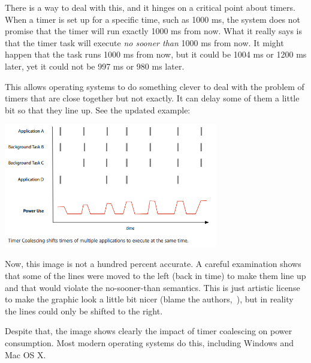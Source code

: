 There is a way to deal with this, and it hinges on a critical point about timers. When a timer is set up for a specific time, such as 1000 ms, the system does not promise that the timer will run exactly 1000 ms from now. What it really says is that the timer task will execute \textit{no sooner than} 1000 ms from now. It might happen that the task runs 1000 ms from now, but it could be 1004 ms or 1200 ms later, yet it could not be 997 ms or 980 ms later.

This allows operating systems to do something clever to deal with the problem of timers that are close together but not exactly. It can delay some of them a little bit so that they line up. See the updated example:

\begin{center}
	\includegraphics[width=0.7\textwidth]{images/coalesced-after.png}
	\cite{coalesce}
\end{center}

Now, this image is not a hundred percent accurate. A careful examination shows that some of the lines were moved to the left (back in time) to make them line up and that would violate the no-sooner-than semantics. This is just artistic license to make the graphic look a little bit nicer (blame the authors,~\cite{coalesce}), but in reality the lines could only be shifted to the right.

Despite that, the image shows clearly the impact of timer coalescing on power consumption. Most modern operating systems do this, including Windows and Mac OS X.





